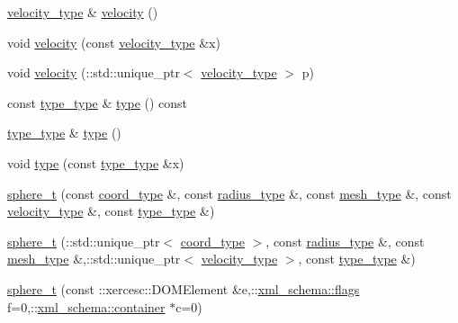 \begin{DoxyCompactItemize}
\hyperlink{classsphere__t_ad38aced876188b1732a5c050670f8cff}{velocity\+\_\+type} \& \hyperlink{classsphere__t_afd348d800c4d0f0ae7be3a1b8cba03a6}{velocity} ()
\item 
void \hyperlink{classsphere__t_a95c6ac0a5d49c053c5dd5b1fa323187b}{velocity} (const \hyperlink{classsphere__t_ad38aced876188b1732a5c050670f8cff}{velocity\+\_\+type} \&x)
\item 
void \hyperlink{classsphere__t_a57a491ec6b0a7be3fd643f5b5b54509e}{velocity} (\+::std\+::unique\+\_\+ptr$<$ \hyperlink{classsphere__t_ad38aced876188b1732a5c050670f8cff}{velocity\+\_\+type} $>$ p)
\item 
const \hyperlink{classsphere__t_a458644a173b4fcac645ccb6e0dd1605f}{type\+\_\+type} \& \hyperlink{classsphere__t_ab33472869fba888db07abe53758adc48}{type} () const 
\item 
\hyperlink{classsphere__t_a458644a173b4fcac645ccb6e0dd1605f}{type\+\_\+type} \& \hyperlink{classsphere__t_a1515e175a16ecfbd80c93ffe05a78b8e}{type} ()
\item 
void \hyperlink{classsphere__t_a96014ef4986a07c43ddf219e138f963f}{type} (const \hyperlink{classsphere__t_a458644a173b4fcac645ccb6e0dd1605f}{type\+\_\+type} \&x)
\item 
\hyperlink{classsphere__t_a9a3c1e8a2e32bd1d922660c9dab85bdc}{sphere\+\_\+t} (const \hyperlink{classsphere__t_a60b541b054e6695017e6468b51a89efd}{coord\+\_\+type} \&, const \hyperlink{classsphere__t_a7d5046bdba409d8f49e7c9902ae56278}{radius\+\_\+type} \&, const \hyperlink{classsphere__t_af7cb7f854954b484b72bbed0516e223a}{mesh\+\_\+type} \&, const \hyperlink{classsphere__t_ad38aced876188b1732a5c050670f8cff}{velocity\+\_\+type} \&, const \hyperlink{classsphere__t_a458644a173b4fcac645ccb6e0dd1605f}{type\+\_\+type} \&)
\item 
\hyperlink{classsphere__t_a39662cec7ffad5e86562f9f3bec61cba}{sphere\+\_\+t} (\+::std\+::unique\+\_\+ptr$<$ \hyperlink{classsphere__t_a60b541b054e6695017e6468b51a89efd}{coord\+\_\+type} $>$, const \hyperlink{classsphere__t_a7d5046bdba409d8f49e7c9902ae56278}{radius\+\_\+type} \&, const \hyperlink{classsphere__t_af7cb7f854954b484b72bbed0516e223a}{mesh\+\_\+type} \&,\+::std\+::unique\+\_\+ptr$<$ \hyperlink{classsphere__t_ad38aced876188b1732a5c050670f8cff}{velocity\+\_\+type} $>$, const \hyperlink{classsphere__t_a458644a173b4fcac645ccb6e0dd1605f}{type\+\_\+type} \&)
\item 
\hyperlink{classsphere__t_a9fcc000c87c32145765cd136e4f19e9a}{sphere\+\_\+t} (const \+::xercesc\+::\+D\+O\+M\+Element \&e,\+::\hyperlink{namespacexml__schema_a0612287d030cb2732d31a45b258fdc87}{xml\+\_\+schema\+::flags} f=0,\+::\hyperlink{namespacexml__schema_ada9aa30dc722e93ee2ed7243085402a5}{xml\+\_\+schema\+::container} $\ast$c=0)

\end{DoxyCompactItemize}
